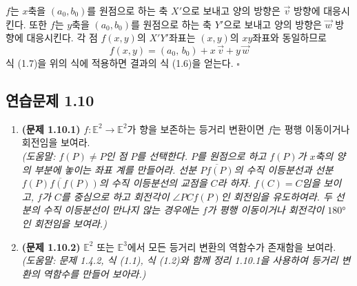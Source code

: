 \documentclass{article}
\begin{document}
$f$는 $x$축을 $(a_0, b_0)$를 원점으로 하는 축 $X'$으로 보내고 양의 방향은 $\vec{v}$ 방향에 대응시킨다.
또한 $f$는 $y$축을 $(a_0, b_0)$를 원점으로 하는 축 $Y'$으로 보내고 양의 방향은 $\vec{w}$ 방향에 대응시킨다.
각 점 $f(x,y)$의 $X'Y'$좌표는 $(x,y)$의 $xy$좌표와 동일하므로
\[
  f(x,y) = (a_0,\, b_0) + x\,\vec{v} + y\,\vec{w}
\]
식 (1.7)을 위의 식에 적용하면 결과의 식 (1.6)을 얻는다.
\hfill $\square$

\subsection*{연습문제 1.10}

\begin{enumerate}
  \item \textbf{(문제 1.10.1)}\quad
    $f : \mathbb{E}^2 \to \mathbb{E}^2$가 향을 보존하는 등거리 변환이면
    $f$는 평행 이동이거나 회전임을 보여라.\\
    \textit{(도움말: $f(P) \neq P$인 점 $P$를 선택한다.
    $P$를 원점으로 하고 $f(P)$가 $x$축의 양의 부분에 놓이는 좌표 계를 만들어라.
    선분 $\overline{Pf(P)}$의 수직 이등분선과 선분 $\overline{f(P)f(f(P))}$의 수직 이등분선의
    교점을 $C$라 하자. $f(C) = C$임을 보이고,
    $f$가 $C$를 중심으로 하고 회전각이 $\angle PCf(P)$인 회전임을 유도하여라.
    두 선분의 수직 이등분선이 만나지 않는 경우에는
    $f$가 평행 이동이거나 회전각이 $180°$인 회전임을 보여라.)}

  \item \textbf{(문제 1.10.2)}\quad
    $\mathbb{E}^2$ 또는 $\mathbb{E}^3$에서 모든 등거리 변환의 역함수가 존재함을 보여라.\\
    \textit{(도움말: 문제 1.4.2, 식 (1.1), 식 (1.2)와 함께 정리 1.10.1을 사용하여
    등거리 변환의 역함수를 만들어 보아라.)}
\end{enumerate}
\end{document}
